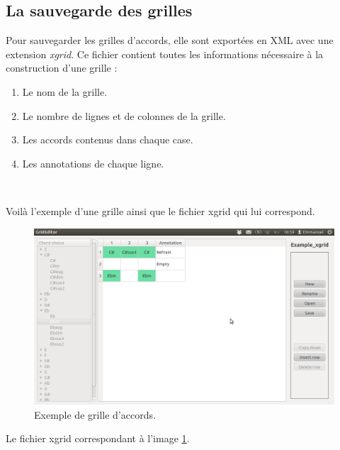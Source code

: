 \subsection{La sauvegarde des grilles}

Pour sauvegarder les grilles d'accords, elle sont exportées en XML avec une extension \textit{xgrid}. Ce fichier contient toutes les informations nécessaire à la construction d'une grille :

\begin{enumerate}
\item{Le nom} de la grille.
\item{Le nombre de lignes et de colonnes} de la grille.
\item{Les accords} contenus dans chaque case.
\item{Les annotations} de chaque ligne.
\end{enumerate}~

Voilà l'exemple d'une grille ainsi que le fichier xgrid qui lui correspond.

\begin{figure}[H]
\includegraphics[width=\textwidth]{grid_example.png}
\caption{Exemple de grille d'accords.}
\label{grid_example}
\end{figure}

Le fichier xgrid correspondant à l'image \ref{grid_example}.

